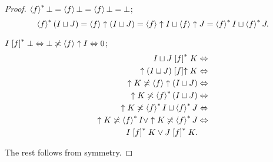 \begin{proof}
$\rsupfun f\bot=\supfun f\bot=\supfun
f\bot=\bot$;
\[
\rsupfun f(I\sqcup J)=\supfun f\uparrow(I\sqcup J)=\supfun f\uparrow
I\sqcup\supfun f\uparrow J=\rsupfun fI\sqcup\rsupfun fJ.
\]


$I\rsuprel
f\bot\Leftrightarrow\bot\nasymp\supfun
f\uparrow I\Leftrightarrow0$;
\begin{align*}
I\sqcup J\rsuprel fK & \Leftrightarrow\\
\uparrow(I\sqcup J)\suprel f\uparrow K & \Leftrightarrow\\
\uparrow K\nasymp\supfun f\uparrow(I\sqcup J) & \Leftrightarrow\\
\uparrow K\nasymp\rsupfun f(I\sqcup J) & \Leftrightarrow\\
\uparrow K\nasymp\rsupfun fI\sqcup\rsupfun fJ & \Leftrightarrow\\
\uparrow K\nasymp\rsupfun fI\lor\uparrow K\nasymp\rsupfun fJ & \Leftrightarrow\\
I\rsuprel fK\lor J\rsuprel fK.
\end{align*}


The rest follows from symmetry.\end{proof}
